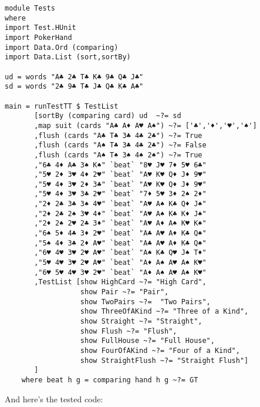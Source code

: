 \begin{lstlisting}[frame=single]
module Tests
where 
import Test.HUnit
import PokerHand
import Data.Ord (comparing)
import Data.List (sort,sortBy)

ud = words "A♣ 2♣ T♣ K♣ 9♣ Q♣ J♣"
sd = words "2♣ 9♣ T♣ J♣ Q♣ K♣ A♣"

main = runTestTT $ TestList 
       [sortBy (comparing card) ud  ~?= sd
       ,map suit (cards "A♣ A♦ A♥ A♠") ~?= ['♣','♦','♥','♠']
       ,flush (cards "A♣ T♣ 3♣ 4♣ 2♣") ~?= True
       ,flush (cards "A♠ T♣ 3♣ 4♣ 2♣") ~?= False
       ,flush (cards "A♠ T♠ 3♠ 4♠ 2♠") ~?= True
       ,"6♣ 4♦ A♣ 3♠ K♠" `beat` "8♥ J♥ 7♦ 5♥ 6♣"
       ,"5♥ 2♦ 3♥ 4♦ 2♥" `beat` "A♥ K♥ Q♦ J♦ 9♥"
       ,"5♥ 4♦ 3♥ 2♦ 3♣" `beat` "A♥ K♥ Q♦ J♦ 9♥"
       ,"5♥ 4♦ 3♥ 3♣ 2♥" `beat` "7♦ 5♥ 3♦ 2♠ 2♦"
       ,"2♦ 2♣ 3♣ 3♠ 4♥" `beat` "A♥ A♠ K♣ Q♦ J♠"  
       ,"2♦ 2♣ 2♠ 3♥ 4♦" `beat` "A♥ A♠ K♣ K♦ J♠"
       ,"2♦ 2♠ 2♥ 2♣ 3♦" `beat` "A♥ A♦ A♠ K♥ K♠"
       ,"6♠ 5♦ 4♣ 3♦ 2♥" `beat` "A♣ A♥ A♦ K♣ Q♠"
       ,"5♠ 4♦ 3♣ 2♦ A♥" `beat` "A♣ A♥ A♦ K♣ Q♠"
       ,"6♥ 4♥ 3♥ 2♥ A♥" `beat` "A♠ K♣ Q♥ J♠ T♦"
       ,"5♥ 4♥ 3♥ 2♥ A♥" `beat` "A♦ A♠ A♥ A♠ K♥"
       ,"6♥ 5♥ 4♥ 3♥ 2♥" `beat` "A♦ A♠ A♥ A♠ K♥"
       ,TestList [show HighCard ~?= "High Card",
                  show Pair ~?= "Pair",
                  show TwoPairs ~?=  "Two Pairs",
                  show ThreeOfAKind ~?= "Three of a Kind",
                  show Straight ~?= "Straight",
                  show Flush ~?= "Flush",
                  show FullHouse ~?= "Full House",
                  show FourOfAKind ~?= "Four of a Kind",
                  show StraightFlush ~?= "Straight Flush"] 
       ]
    where beat h g = comparing hand h g ~?= GT
\end{lstlisting} %
\lhA And here's the tested code:
